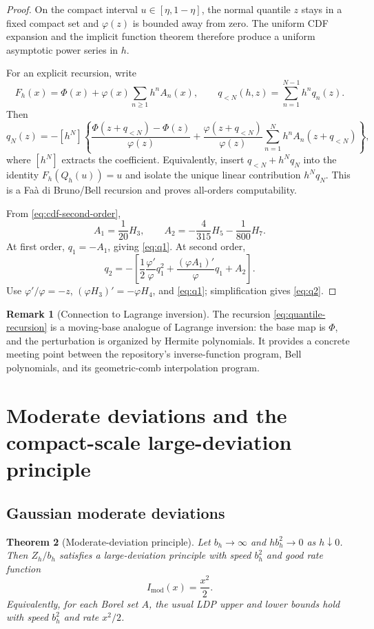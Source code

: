 \documentclass[11pt]{article}
\numberwithin{equation}{section}
\newtheorem{theorem}{Theorem}[section]
\theoremstyle{definition}
\newtheorem{remark}[theorem]{Remark}
\newcommand{\phiN}{\varphi}
\newcommand{\PhiN}{\Phi}
\begin{document}
\begin{proof}
On the compact interval \(u\in[\eta,1-\eta]\), the normal quantile \(z\) stays in a fixed compact set and \(\phiN(z)\) is bounded away from zero.  The uniform CDF expansion and the implicit function theorem therefore produce a uniform asymptotic power series in \(h\).

For an explicit recursion, write
\[
 F_h(x)=\PhiN(x)+\phiN(x)\sum_{n\ge1}h^nA_n(x),
 \qquad
 q_{<N}(h,z)=\sum_{n=1}^{N-1}h^nq_n(z).
\]
Then
\begin{equation}\label{eq:quantile-recursion}
 q_N(z)=-[h^N]\left\{
 \frac{\PhiN(z+q_{<N})-\PhiN(z)}{\phiN(z)}
 +\frac{\phiN(z+q_{<N})}{\phiN(z)}
  \sum_{n=1}^{N}h^nA_n(z+q_{<N})
 \right\},
\end{equation}
where \([h^N]\) extracts the coefficient.  Equivalently, insert \(q_{<N}+h^Nq_N\) into the identity \(F_h(Q_h(u))=u\) and isolate the unique linear contribution \(h^Nq_N\).  This is a Fa\`a di Bruno/Bell recursion and proves all-orders computability.

From \eqref{eq:cdf-second-order},
\[
 A_1=\frac1{20}H_3,
 \qquad
 A_2=-\frac4{315}H_5-\frac1{800}H_7.
\]
At first order, \(q_1=-A_1\), giving \eqref{eq:q1}.  At second order,
\[
 q_2=-\left[\frac12\frac{\phiN'}{\phiN}q_1^2
 +\frac{(\phiN A_1)'}{\phiN}q_1+A_2\right].
\]
Use \(\phiN'/\phiN=-z\), \((\phiN H_3)'=-\phiN H_4\), and \eqref{eq:q1}; simplification gives \eqref{eq:q2}.
\end{proof}

\begin{remark}[Connection to Lagrange inversion]
The recursion \eqref{eq:quantile-recursion} is a moving-base analogue of Lagrange inversion: the base map is \(\PhiN\), and the perturbation is organized by Hermite polynomials.  It provides a concrete meeting point between the repository's inverse-function program, Bell polynomials, and its geometric-comb interpolation program.
\end{remark}

\section{Moderate deviations and the compact-scale large-deviation principle}\label{sec:ldp}

\subsection{Gaussian moderate deviations}
\begin{theorem}[Moderate-deviation principle]\label{thm:moderate-deviations}
Let \(b_h\to\infty\) and \(hb_h^2\to0\) as \(h\downarrow0\).  Then \(Z_h/b_h\) satisfies a large-deviation principle with speed \(b_h^2\) and good rate function
\begin{equation}\label{eq:moderate-rate}
 I_{\mathrm{mod}}(x)=\frac{x^2}{2}.
\end{equation}
Equivalently, for each Borel set \(A\), the usual LDP upper and lower bounds hold with speed \(b_h^2\) and rate \(x^2/2\).
\end{theorem}
\end{document}
